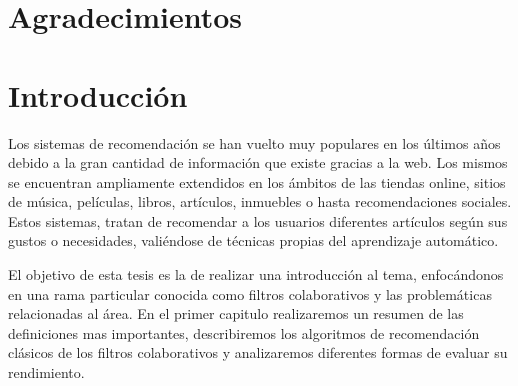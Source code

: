\documentclass[hidelinks,12pt,a4paper]{book}
\theoremstyle{plain}
\theoremstyle{definition}
\begin{document}


\setcounter{page}{3}


\chapter*{Agradecimientos}



\tableofcontents

\mainmatter %
\pagestyle{headings}

\chapter*{Introducción}

Los sistemas de recomendación se han vuelto muy populares en los últimos años debido a la gran cantidad de información que existe gracias a la web. Los mismos se encuentran ampliamente extendidos en los ámbitos de las tiendas online, sitios de música, películas, libros, artículos, inmuebles o hasta recomendaciones sociales. Estos sistemas, tratan de recomendar a los usuarios diferentes artículos según sus gustos o necesidades, valiéndose de técnicas propias del aprendizaje automático.

El objetivo de esta tesis es la de realizar una introducción al tema, enfocándonos en una rama particular conocida como filtros colaborativos y las problemáticas relacionadas al área. En el primer capitulo realizaremos un resumen de las definiciones mas importantes, describiremos los algoritmos de recomendación clásicos de los filtros colaborativos y analizaremos diferentes formas de evaluar su rendimiento.
\end{document}
